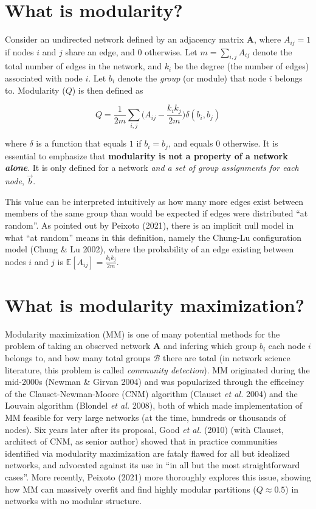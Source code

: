 \documentclass[
]{article}
\begin{document}
\hypertarget{what-is-modularity}{%
\section{What is modularity?}\label{what-is-modularity}}

Consider an undirected network defined by an adjacency matrix
\(\mathbf{A}\), where \(A_{ij} = 1\) if nodes \(i\) and \(j\) share an
edge, and \(0\) otherwise. Let \(m = \sum_{i,j} A_{ij}\) denote the
total number of edges in the network, and \(k_i\) be the degree (the
number of edges) associated with node \(i\). Let \(b_i\) denote the
\emph{group} (or module) that node \(i\) belongs to. Modularity (\(Q\))
is then defined as

\[Q = \frac{1}{2m} \sum_{i,j} \bigg( A_{ij} - \frac{k_i k_j}{2m}\bigg)
\delta(b_i, b_j)\]

where \(\delta\) is a function that equals \(1\) if \(b_i = b_j\), and
equals \(0\) otherwise. It is essential to emphasize that
\textbf{modularity is not a property of a network \emph{alone}}. It is
only defined for a network \emph{and a set of group assignments for each
node}, \(\vec{b}\).

This value can be interpreted intuitively as how many more edges exist
between members of the same group than would be expected if edges were
distributed ``at random''. As pointed out by Peixoto (2021), there is an
implicit null model in what ``at random'' means in this definition,
namely the Chung-Lu configuration model (Chung \& Lu 2002), where the
probability of an edge existing between nodes \(i\) and \(j\) is
\(\mathbb{E}[A_{ij}] = \frac{k_i k_j}{2m}\).

\hypertarget{what-is-modularity-maximization}{%
\section{What is modularity
maximization?}\label{what-is-modularity-maximization}}

Modularity maximization (MM) is one of many potential methods for the
problem of taking an observed network \(\mathbf{A}\) and infering which
group \(b_i\) each node \(i\) belongs to, and how many total groups
\(\mathcal{B}\) there are total (in network science literature, this
problem is called \emph{community detection}). MM originated during the
mid-2000s (Newman \& Girvan 2004) and was popularized through the
efficeincy of the Clauset-Newman-Moore (CNM) algorithm (Clauset \emph{et
al.} 2004) and the Louvain algorithm (Blondel \emph{et al.} 2008), both
of which made implementation of MM feasible for very large networks (at
the time, hundreds or thousands of nodes). Six years later after its
proposal, Good \emph{et al.} (2010) (with Clauset, architect of CNM, as
senior author) showed that in practice communities identified via
modularity maximization are fataly flawed for all but idealized
networks, and advocated against its use in ``in all but the most
straightforward cases''. More recently, Peixoto (2021) more thoroughly
explores this issue, showing how MM can massively overfit and find
highly modular partitions (\(Q \approx 0.5\)) in networks with no
modular structure.
\end{document}
